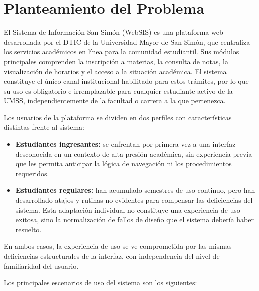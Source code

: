 \section{Planteamiento del Problema}

    El Sistema de Información San Simón (WebSIS) es una plataforma web desarrollada por el DTIC de la Universidad Mayor de San Simón, que centraliza los servicios académicos en línea para la comunidad estudiantil. Sus módulos principales comprenden la inscripción a materias, la consulta de notas, la visualización de horarios y el acceso a la situación académica. El sistema constituye el único canal institucional habilitado para estos trámites, por lo que su uso es obligatorio e irremplazable para cualquier estudiante activo de la UMSS, independientemente de la facultad o carrera a la que pertenezca.

    Los usuarios de la plataforma se dividen en dos perfiles con características distintas frente al sistema:

        \begin{itemize}

            \item \textbf{Estudiantes ingresantes:} se enfrentan por primera vez a una interfaz desconocida en un contexto de alta presión académica, sin experiencia previa que les permita anticipar la lógica de navegación ni los procedimientos requeridos.

            \item \textbf{Estudiantes regulares:} han acumulado semestres de uso continuo, pero han desarrollado atajos y rutinas no evidentes para compensar las deficiencias del sistema. Esta adaptación individual no constituye una experiencia de uso exitosa, sino la normalización de fallos de diseño que el sistema debería haber resuelto.

        \end{itemize}

    En ambos casos, la experiencia de uso se ve comprometida por las mismas deficiencias estructurales de la interfaz, con independencia del nivel de familiaridad del usuario.

    Los principales escenarios de uso del sistema son los siguientes:

